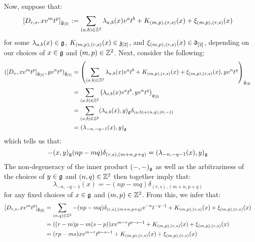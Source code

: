 \begin{remark}
\begin{enumerate}
                    Now, suppose that:
                        $$[D_{r, s}, x v^m t^p]_{\hat{\mathfrak{g}}_{[2]}} := \sum_{(a, b) \in \mathbb{Z}^2} \lambda_{a, b}(x) v^a t^b + K_{(m, p), (r, s)}(x) + \xi_{(m, p), (r, s)}(x)$$
                    for some $\lambda_{a, b}(x) \in \mathfrak{g}$, $K_{(m, p), (r, s)}(x) \in \mathfrak{z}_{[2]}$, and $\xi_{(m, p), (r, s)}(x) \in \mathfrak{d}_{[2]}$, depending on our choices of $x \in \mathfrak{g}$ and $(m, p) \in \mathbb{Z}^2$. Next, consider the following:
                        $$
                            \begin{aligned}
                                ( [D_v, x v^m t^p]_{\hat{\mathfrak{g}}_{[2]}}, y v^n t^q )_{\hat{\mathfrak{g}}_{[2]}} & = \left( \sum_{(a, b) \in \mathbb{Z}^2} \lambda_{a, b}(x) v^a t^b + K_{(m, p), (r, s)}(x) + \xi_{(m, p), (r, s)}(x), y v^n t^q \right)_{\hat{\mathfrak{g}}_{[2]}}
                                \\
                                & = \sum_{(a, b) \in \mathbb{Z}^2} \left( \lambda_{a, b}(x) v^a t^b, y v^n t^q \right)_{\mathfrak{g}_{[2]}}
                                \\
                                & = \sum_{(a, b) \in \mathbb{Z}^2} (\lambda_{a, b}(x), y)_{\mathfrak{g}} \delta_{ (a, b) + (n, q), (0, -1) }
                                \\
                                & = (\lambda_{-n, -q - 1}(x), y)_{\mathfrak{g}}
                            \end{aligned}
                        $$
                    which tells us that:
                        $$-(x, y)_{\mathfrak{g}} (np - mq) \delta_{(r, s), (m + n, p + q)} = (\lambda_{-n, -q - 1}(x), y)_{\mathfrak{g}}$$
                    The non-degeneracy of the inner product $(-, -)_{\mathfrak{g}}$ as well as the arbitrariness of the choices of $y \in \mathfrak{g}$ and $(n, q) \in \mathbb{Z}^2$ then together imply that:
                        $$\lambda_{-n, -q - 1}(x) = -(np - mq) \delta_{(r, s), (m + n, p + q)}$$
                    for any fixed choices of $x \in \mathfrak{g}$ and $(m, p) \in \mathbb{Z}^2$. From this, we infer that:
                        $$
                            \begin{aligned}
                                [D_{r, s}, x v^m t^p]_{\hat{\g}_{[2]}} & = \sum_{(n, q) \in \Z^2} -(np - mq) \delta_{(r, s), (m + n, p + q)} v^{-n} t^{-q - 1} + K_{(m, p), (r, s)}(x) + \xi_{(m, p), (r, s)}(x)
                                \\
                                & = ( (r - m)p - m(s - p) ) x v^{m - r} t^{p - s - 1} + K_{(m, p), (r, s)}(x) + \xi_{(m, p), (r, s)}(x)
                                \\
                                & = ( rp - ms ) x v^{m - r} t^{p - s - 1} + K_{(m, p), (r, s)}(x) + \xi_{(m, p), (r, s)}(x)
                            \end{aligned}
                        $$
                        

\end{enumerate}
\end{remark}
